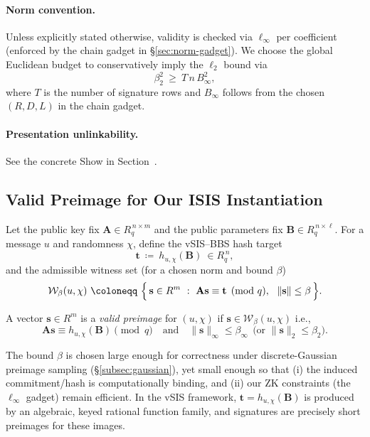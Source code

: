 \paragraph{Norm convention.}\label{par:norm-conv}
Unless explicitly stated otherwise, validity is checked via $\ell_\infty$ per coefficient (enforced by the chain gadget in \S\ref{sec:norm-gadget}). We choose the global Euclidean budget to conservatively imply the $\ell_2$ bound via
\[
\beta_2^2\ \ge\ T\,n\,B_\infty^2,
\]
where $T$ is the number of signature rows and $B_\infty$ follows from the chosen $(R,D,L)$ in the chain gadget.


\paragraph{Presentation unlinkability.} See the concrete \textsf{Show} in Section~.

\subsection{Valid Preimage for Our ISIS Instantiation}
\label{subsec:valid-preimage-refined}
Let the public key fix \(\mathbf{A}\in R_q^{\,n\times m}\) and the public parameters fix \(\mathbf{B}\in R_q^{\,n\times \ell}\).
For a message \(u\) and randomness \(\chi\), define the vSIS–BBS hash target
\[
  \mathbf{t}\ \coloneqq\ h_{u,\chi}(\mathbf{B})\ \in R_q^{\,n},
\]
and the admissible witness set (for a chosen norm and bound \(\beta\))
\[
  \mathcal{W}_\beta(u,\chi)\ \coloneqq\ \Bigl\{\,\mathbf{s}\in R^{m}\ :\ \mathbf{A}\mathbf{s}\equiv \mathbf{t}\pmod q,\ \ \|\mathbf{s}\|\le \beta\,\Bigr\}.
\]
\begin{definition}
A vector \(\mathbf{s}\in R^{m}\) is a \emph{valid preimage} for \((u,\chi)\) if
\(\mathbf{s}\in \mathcal{W}_\beta(u,\chi)\) i.e.,
\[
  \mathbf{A}\mathbf{s}\equiv h_{u,\chi}(\mathbf{B})\pmod q
  \quad\text{and}\quad
  \|\mathbf{s}\|_\infty\le \beta_\infty\ \ \text{(or }\|\mathbf{s}\|_2\le \beta_2\text{)}.
\]
\end{definition}
The bound \(\beta\) is chosen large enough for correctness under discrete-Gaussian preimage sampling
(\S\ref{subsec:gaussian}), yet small enough so that (i) the induced commitment/hash is computationally
binding, and (ii) our ZK constraints (the \(\ell_\infty\) gadget) remain efficient. In the vSIS
framework, \(\mathbf{t}=h_{u,\chi}(\mathbf{B})\) is produced by an algebraic, keyed rational function family,
and signatures are precisely short preimages for these images. 

